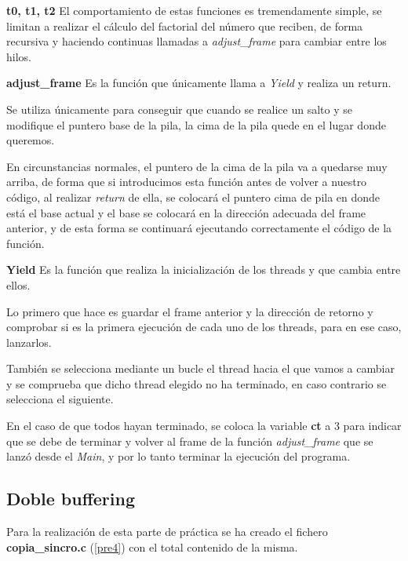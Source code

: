 \documentclass[12pt,a4paper,helvetica,titlepage]{article}
\begin{document}
\begin{description}

    \item \textbf{t0, t1, t2} 
    El comportamiento de estas funciones es tremendamente simple, se limitan a realizar
el cálculo del factorial del número que reciben, de forma recursiva y haciendo continuas
llamadas a \emph{adjust\_frame} para cambiar entre los hilos.

    \item \textbf{adjust\_frame}
    Es la función que únicamente llama a \emph{Yield} y realiza un return.
    
    Se utiliza únicamente para conseguir que cuando se realice un salto y se modifique el
puntero base de la pila, la cima de la pila quede en el lugar donde queremos.

En circunstancias normales, el puntero de la cima de la pila va a quedarse muy arriba, de
forma que si introducimos esta función antes de volver a nuestro código, al realizar
\emph{return} de ella, se colocará el puntero cima de pila en donde está el base actual y
el base se colocará en la dirección adecuada del frame anterior, y de esta forma se
continuará ejecutando correctamente el código de la función.

    \item \textbf{Yield}
    Es la función que realiza la inicialización de los threads y que cambia entre ellos.
    
    Lo primero que hace es guardar el frame anterior y la dirección de retorno y
comprobar si es la primera ejecución de cada uno de los threads, para en ese caso,
lanzarlos.

También se selecciona mediante un bucle el thread hacia el que vamos a cambiar y se
comprueba que dicho thread elegido no ha terminado, en caso contrario se selecciona el
siguiente.

En el caso de que todos hayan terminado, se coloca la variable \textbf{ct} a 3 para
indicar que se debe de terminar y volver al frame de la función \emph{adjust\_frame} que
se lanzó desde el \emph{Main}, y por lo tanto terminar la ejecución del programa.

\end{description}

\subsection{Doble buffering}
Para la realización de esta parte de práctica se ha creado el fichero
\textbf{copia\_sincro.c} (\ref{pre4}) con el total contenido de la misma.\\
\end{document}
